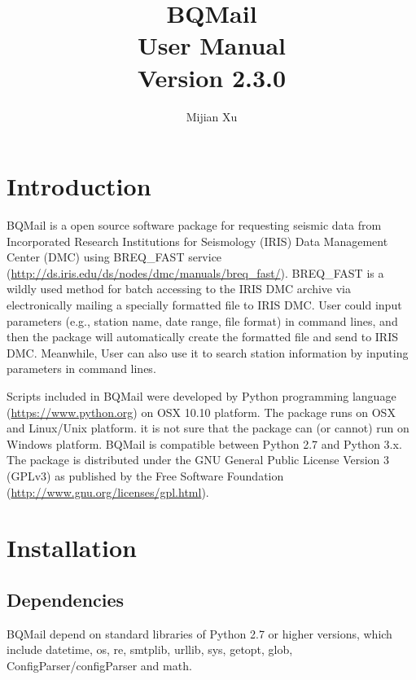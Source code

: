 \documentclass[12pt, a4paper]{report}
\title{BQMail\\User Manual\\Version 2.3.0}
\author[1,*]{Mijian Xu}
\affil[1]{\small School of Earth Science and Engineering, Nanjing University}
\affil[*]{\small Email: gomijianxu@gmail.com}
\begin{document}
\maketitle
\tableofcontents
\chapter{Introduction}

BQMail is a open source software package for requesting seismic data from Incorporated Research Institutions for Seismology (IRIS) Data Management Center (DMC) using BREQ\_FAST service (\url{http://ds.iris.edu/ds/nodes/dmc/manuals/breq_fast/}). BREQ\_FAST is a wildly used method for batch accessing to the IRIS DMC archive via electronically mailing a specially formatted file to IRIS DMC. User could input parameters (e.g., station name, date range, file format) in command lines, and then the package will automatically create the formatted file and send to IRIS DMC. Meanwhile, User can also use it to search station information by inputing parameters in command lines.

Scripts included in BQMail were developed by Python programming language (\url{https://www.python.org}) on OSX 10.10 platform. The package runs on OSX and Linux/Unix platform. it is not sure that the package can (or cannot) run on Windows platform. BQMail is compatible between Python 2.7 and Python 3.x. The package is distributed under the GNU General Public License Version 3 (GPLv3) as published by the Free Software Foundation (\url{http://www.gnu.org/licenses/gpl.html}).

\chapter{Installation}

\section{Dependencies}
BQMail depend on standard libraries of Python 2.7 or higher versions, which include datetime, os, re, smtplib, urllib, sys, getopt, glob, ConfigParser/configParser and math.

\end{document}
